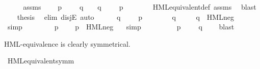 \begin{isabellebody}
%
\isadelimproof
%
\endisadelimproof
%
\isatagproof
{}\isamarkupfalse%
\ {\isacharminus}{\kern0pt}\isanewline
\ \ \isamarkupfalse%
\ assms\ \isamarkupfalse%
\ {\isasymphi}\ \ {\isacartoucheopen}p\ {\isasymTurnstile}\ {\isasymphi}\ {\isasymand}\ {\isasymnot}\ q\ {\isasymTurnstile}\ {\isasymphi}\ {\isasymor}\ q\ {\isasymTurnstile}\ {\isasymphi}\ {\isasymand}\ {\isasymnot}\ p\ {\isasymTurnstile}\ {\isasymphi}{\isacartoucheclose}\isanewline
\ \ \ \ \isamarkupfalse%
\ HML{\isacharunderscore}{\kern0pt}equivalent{\isacharunderscore}{\kern0pt}def\ assms\ \isamarkupfalse%
\ blast\isanewline
\ \ \isamarkupfalse%
\ {\isacharquery}{\kern0pt}thesis\ \isamarkupfalse%
\ {\isacharparenleft}{\kern0pt}elim\ disjE{\isacharcomma}{\kern0pt}\ auto{\isacharparenright}{\kern0pt}\isanewline
\ \ \ \ \isamarkupfalse%
\ {\isacartoucheopen}q\ {\isasymTurnstile}\ {\isasymphi}{\isacartoucheclose}\ \ {\isacartoucheopen}{\isasymnot}\ p\ {\isasymTurnstile}\ {\isasymphi}{\isacartoucheclose}\isanewline
\ \ \ \ \isamarkupfalse%
\ {\isacartoucheopen}q\ {\isasymTurnstile}\ {\isasymphi}{\isacartoucheclose}\ \isamarkupfalse%
\ {\isacartoucheopen}{\isasymnot}\ q\ {\isasymTurnstile}\ HML{\isacharunderscore}{\kern0pt}neg\ {\isasymphi}{\isacartoucheclose}\ \isamarkupfalse%
\ simp\isanewline
\ \ \ \ \isamarkupfalse%
\ \isamarkupfalse%
\ {\isacartoucheopen}{\isasymnot}\ p\ {\isasymTurnstile}\ {\isasymphi}{\isacartoucheclose}\ \isamarkupfalse%
\ {\isacartoucheopen}p\ {\isasymTurnstile}\ HML{\isacharunderscore}{\kern0pt}neg\ {\isasymphi}{\isacartoucheclose}\ \isamarkupfalse%
\ simp\isanewline
\ \ \ \ \isamarkupfalse%
\ \isamarkupfalse%
\ {\isacartoucheopen}{\isasymexists}\ {\isasymphi}{\isachardot}{\kern0pt}\ p\ {\isasymTurnstile}\ {\isasymphi}\ {\isasymand}\ {\isasymnot}\ q\ {\isasymTurnstile}\ {\isasymphi}{\isacartoucheclose}\ \isamarkupfalse%
\ blast\isanewline
\ \ \isamarkupfalse%
\isanewline
{}\isamarkupfalse%
%
\endisatagproof
{\isafoldproof}%
%
\isadelimproof
%
\endisadelimproof
%
\begin{isamarkuptext}%
HML-equivalence is clearly symmetrical.%
\end{isamarkuptext}\isamarkuptrue%
\isamarkupfalse%
\ HML{\isacharunderscore}{\kern0pt}equivalent{\isacharunderscore}{\kern0pt}symm{\isacharcolon}{\kern0pt}\isanewline

\end{isabellebody}
